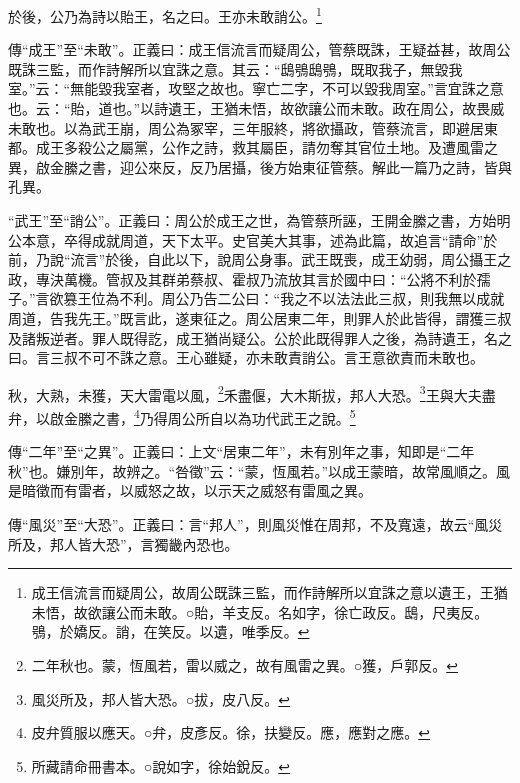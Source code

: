 於後，公乃為詩以貽王，名之曰。王亦未敢誚公。\footnote{成王信流言而疑周公，故周公既誅三監，而作詩解所以宜誅之意以遺王，王猶未悟，故欲讓公而未敢。○貽，羊支反。名如字，徐亡政反。鴟，尺夷反。鴞，於嬌反。誚，在笑反。以遺，唯季反。}

{\noindent\zhuan{}\fzbyks 傳“成王”至“未敢”。正義曰：成王信流言而疑周公，管蔡既誅，王疑益甚，故周公既誅三監，而作詩解所以宜誅之意。其云：“鴟鴞鴟鴞，既取我子，無毀我室。”云：“無能毀我室者，攻堅之故也。寧亡二字，不可以毀我周室。”言宜誅之意也。云：“貽，道也。”以詩遺王，王猶未悟，故欲讓公而未敢。政在周公，故畏威未敢也。以為武王崩，周公為冢宰，三年服終，將欲攝政，管蔡流言，即避居東都。成王多殺公之屬黨，公作之詩，救其屬臣，請勿奪其官位土地。及遭風雷之異，啟金縢之書，迎公來反，反乃居攝，後方始東征管蔡。解此一篇乃之詩，皆與孔異。 \par}

{\noindent\shu{}\fzkt “武王”至“誚公”。正義曰：周公於成王之世，為管蔡所誣，王開金縢之書，方始明公本意，卒得成就周道，天下太平。史官美大其事，述為此篇，故追言“請命”於前，乃說“流言”於後，自此以下，說周公身事。武王既喪，成王幼弱，周公攝王之政，專決萬機。管叔及其群弟蔡叔、霍叔乃流放其言於國中曰：“公將不利於孺子。”言欲篡王位為不利。周公乃告二公曰：“我之不以法法此三叔，則我無以成就周道，告我先王。”既言此，遂東征之。周公居東二年，則罪人於此皆得，謂獲三叔及諸叛逆者。罪人既得訖，成王猶尚疑公。公於此既得罪人之後，為詩遺王，名之曰。言三叔不可不誅之意。王心雖疑，亦未敢責誚公。言王意欲責而未敢也。 \par}

秋，大熟，未獲，天大雷電以風，\footnote{二年秋也。蒙，恆風若，雷以威之，故有風雷之異。○獲，戶郭反。}禾盡偃，大木斯拔，邦人大恐。\footnote{風災所及，邦人皆大恐。○拔，皮八反。}王與大夫盡弁，以啟金縢之書，\footnote{皮弁質服以應天。○弁，皮彥反。徐，扶變反。應，應對之應。}乃得周公所自以為功代武王之說。\footnote{所藏請命冊書本。○說如字，徐始銳反。}


{\noindent\zhuan{}\fzbyks 傳“二年”至“之異”。正義曰：上文“居東二年”，未有別年之事，知即是“二年秋”也。嫌別年，故辨之。“咎徵”云：“蒙，恆風若。”以成王蒙暗，故常風順之。風是暗徵而有雷者，以威怒之故，以示天之威怒有雷風之異。 \par}

{\noindent\zhuan{}\fzbyks 傳“風災”至“大恐”。正義曰：言“邦人”，則風災惟在周邦，不及寬遠，故云“風災所及，邦人皆大恐”，言獨畿內恐也。 \par}

